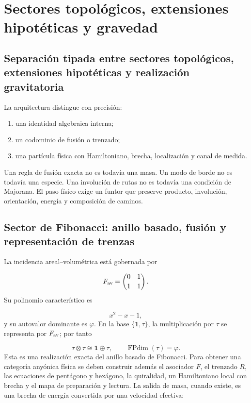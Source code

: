 \section{Sectores topológicos, extensiones hipotéticas y gravedad}
\subsection{Separación tipada entre sectores topológicos, extensiones hipotéticas y realización gravitatoria}
La arquitectura distingue con precisión:

\begin{enumerate}
\item una identidad algebraica interna;
\item un codominio de fusión o trenzado;
\item una partícula física con Hamiltoniano, brecha, localización y canal de
medida.

\end{enumerate}
Una regla de fusión exacta no es todavía una masa. Un modo de borde no es todavía una especie. Una involución de rutas no es todavía una condición de Majorana. El paso físico exige un funtor que preserve producto, involución, orientación, energía y composición de caminos.

\subsection{Sector de Fibonacci: anillo basado, fusión y representación de trenzas}
La incidencia areal--volumétrica está gobernada por

\[
F_{\rm av}=
\begin{pmatrix}
0&1\\[2pt]1&1
\end{pmatrix}.
\]
Su polinomio característico es

\[
x^2-x-1,
\]
y su autovalor dominante es \(\varphi\). En la base \(\{\mathbf1,\tau\}\), la multiplicación por \(\tau\) se representa por \(F_{\rm av}\); por tanto

\[
\tau\otimes\tau\cong\mathbf1\oplus\tau,
\qquad
\operatorname{FPdim}(\tau)=\varphi.
\]
Esta es una realización exacta del anillo basado de Fibonacci. Para obtener una categoría anyónica física se deben construir además el asociador \(F\), el trenzado \(R\), las ecuaciones de pentágono y hexágono, la quiralidad, un Hamiltoniano local con brecha y el mapa de preparación y lectura. La salida de masa, cuando existe, es una brecha de energía convertida por una velocidad efectiva:

